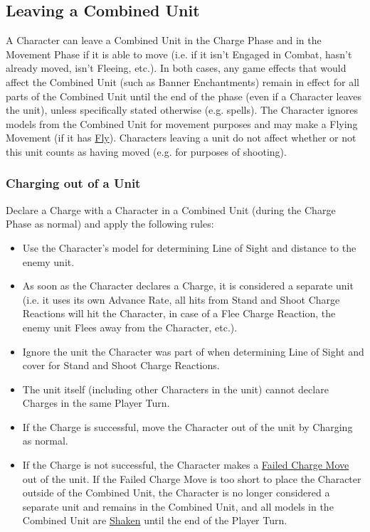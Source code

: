 \subsection{Leaving a Combined Unit}

A Character can leave a Combined Unit in the Charge Phase and in the Movement Phase if it is able to move (i.e. if it isn't Engaged in Combat, hasn't already moved, isn't Fleeing, etc.). In both cases, any game effects that would affect the Combined Unit (such as Banner Enchantments) remain in effect for all parts of the Combined Unit until the end of the phase (even if a Character leaves the unit), unless specifically stated otherwise (e.g. \oneturn{} spells). The Character ignores models from the Combined Unit for movement purposes and may make a Flying Movement (if it has \hyperref[fly]{Fly}). Characters leaving a unit do not affect whether or not this unit counts as having moved (e.g. for purposes of shooting).

\subsubsection{Charging out of a Unit}

Declare a Charge with a Character in a Combined Unit (during the Charge Phase as normal) and apply the following rules:

\begin{itemize}
	\item Use the Character's model for determining Line of Sight and distance to the enemy unit.
	\item As soon as the Character declares a Charge, it is considered a separate unit (i.e. it uses its own Advance Rate, all hits from Stand and Shoot Charge Reactions will hit the Character, in case of a Flee Charge Reaction, the enemy unit Flees away from the Character, etc.).
	\item Ignore the unit the Character was part of when determining Line of Sight and cover for Stand and Shoot Charge Reactions.
	\item The unit itself (including other Characters in the unit) cannot declare Charges in the same Player Turn.
	\item If the Charge is successful, move the Character out of the unit by Charging as normal.
	\item If the Charge is not successful, the Character makes a \hyperref[failed_charge]{Failed Charge Move} out of the unit. If the Failed Charge Move is too short to place the Character outside  of the Combined Unit, the Character is no longer considered a separate unit and remains in the Combined Unit, and all models in the Combined Unit are \hyperref[shaken]{Shaken} until the end of the Player Turn.
\end{itemize}

